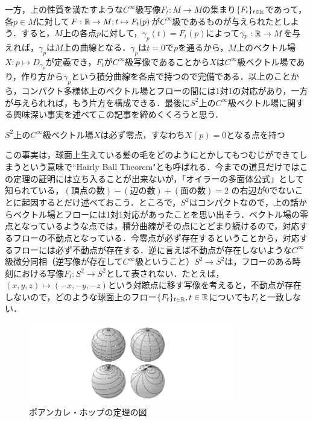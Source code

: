 一方，上の性質を満たすような$C^\infty$級写像$F_t:M\rightarrow M$の集まり$\{F_t\}_{t\in{\mathbb R}}$であって，各$p\in M$に対して$F:{\mathbb R}\rightarrow M;t\mapsto F_t(p)$が$C^\infty$級であるものが与えられたとしよう．すると，$M$上の各点$p$に対して，$\gamma_p(t)=F_t(p)$によって$\gamma_p:{\mathbb R}\rightarrow M$を与えれば，$\gamma_p$は$M$上の曲線となる．$\gamma_p$は$t=0$で$p$を通るから，$M$上のベクトル場$X:p\mapsto D_{\gamma_p}$が定義でき，$F_t$が$C^\infty$級写像であることから$X$は$C^\infty$級ベクトル場であり，作り方から$\gamma_p$という積分曲線を各点で持つので完備である．以上のことから，コンパクト多様体上のベクトル場とフローの間には1対1の対応があり，一方が与えられれば，もう片方を構成できる．最後に$S^2$上の$C^\infty$級ベクトル場に関する興味深い事実を述べてこの記事を締めくくろうと思う．
\begin{s_theo}
$S^2$上の$C^\infty$級ベクトル場$X$は必ず零点，すなわち$X(p)=0$となる点を持つ
\end{s_theo}
この事実は，球面上生えている髪の毛をどのようにとかしてもつむじができてしまうという意味で``Hairly Ball Theorem"とも呼ばれる．今までの道具だけではこの定理の証明には立ち入ることが出来ないが，「オイラーの多面体公式」として知られている，$(頂点の数)-(辺の数)+(面の数)=2$ の右辺が0でないことに起因するとだけ述べておこう．ところで，$S^2$はコンパクトなので，上の話からベクトル場とフローには1対1対応があったことを思い出そう．ベクトル場の零点となっているような点では，積分曲線がその点にとどまり続けるので，対応するフローの不動点となっている．今零点が必ず存在するということから，対応するフローには必ず不動点が存在する．逆に言えば不動点が存在しないような$C^\infty$級微分同相（逆写像が存在して$C^\infty$級ということ）$S^2\rightarrow S^2$は，フローのある時刻における写像$F_t:S^2\rightarrow S^2$として表されない．たとえば，$(x,y,z)\mapsto (-x,-y,-z)$という対蹠点に移す写像を考えると，不動点が存在しないので，どのような球面上のフロー$\{F_t\}_{t\in{\mathbb R}},t\in{\mathbb R}$についても$F_t$と一致しない．
\begin{figure}[h]
  \begin{center} 
    \includegraphics[width=9.0cm]{dev_phthm}
    \caption{ポアンカレ・ホップの定理の図}
  \end{center}
\end{figure}
